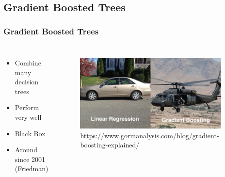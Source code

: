 \subsection{Gradient Boosted Trees}

\begin{frame}
	\frametitle{Gradient Boosted Trees}
	\begin{columns}[onlytextwidth]
		\begin{itemize}
			\item Combine many decision trees
			\item Perform very well
			\item Black Box
			\item Around since 2001 (Friedman)
		\end{itemize}
		
		\begin{figure}
			\includegraphics[width=0.95\textwidth]{pics/helicopter.jpg}
			\tiny{https://www.gormanalysis.com/blog/gradient-boosting-explained/}
		\end{figure}
	\end{columns}
\end{frame}

